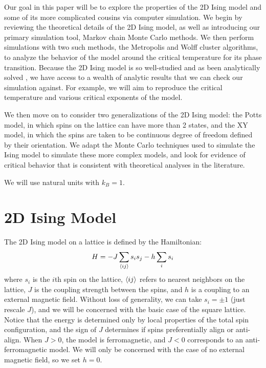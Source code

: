 \documentclass[twocolumn,aps]{revtex4-1} %
\begin{document}
Our goal in this paper will be to explore the properties of the 2D Ising model and some of its more complicated cousins via computer simulation. We begin by reviewing the theoretical details of the 2D Ising model, as well as introducing our primary simulation tool, Markov chain Monte Carlo methods. We then perform simulations with two such methods, the Metropolis and Wolff cluster algorithms, to analyze the behavior of the model around the critical temperature for its phase transition. Because the 2D Ising model is so well-studied and as been analytically solved \cite{onsager}, we have access to a wealth of analytic results that we can check our simulation against. For example, we will aim to reproduce the critical temperature and various critical exponents of the model.

We then move on to consider two generalizations of the 2D Ising model: the Potts model, in which spins on the lattice can have more than 2 states, and the XY model, in which the spins are taken to be continuous degree of freedom defined by their orientation. We adapt the Monte Carlo techniques used to simulate the Ising model to simulate these more complex models, and look for evidence of critical behavior that is consistent with theoretical analyses in the literature.

We will use natural units with $k_B = 1$. 


\section{2D Ising Model}
The 2D Ising model on a lattice is defined by the Hamiltonian:
\begin{equation}
H = -J\sum_{\braket{ij}}s_is_j - h\sum_i s_i
\end{equation}
where $s_i$ is the $i$th spin on the lattice, $\braket{ij}$ refers to nearest neighbors on the lattice, $J$ is the coupling strength between the spins, and $h$ is a coupling to an external magnetic field. Without loss of generality, we can take $s_i = \pm 1$ (just rescale $J$), and we will be concerned with the basic case of the square lattice. Notice that the energy is determined only by local properties of the total spin configuration, and the sign of $J$ determines if spins preferentially align or anti-align. When $J > 0$, the model is ferromagnetic, and $J < 0$ corresponds to an anti-ferromagnetic model. We will only be concerned with the case of no external magnetic field, so we set $h = 0$. 
\end{document}
